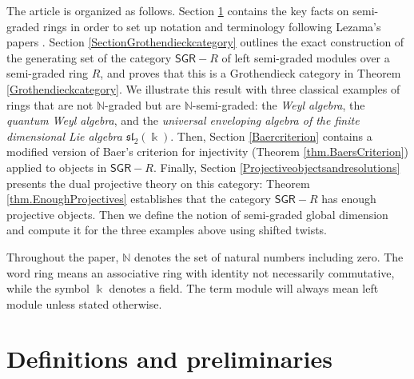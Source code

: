\documentclass[reqno]{amsart}
\theoremstyle{definition}
\theoremstyle{remark}
\numberwithin{equation}{section}
\begin{document}
The article is organized as follows. Section \ref{DefinitionsandPreliminaries} contains the key facts on semi-graded rings in order to set up notation and terminology following Lezama's papers \cite{Lezama2021, LezamaLatorre2017}. Section \ref{SectionGrothendieckcategory} outlines the exact construction of the generating set of the category $\mathsf{SGR}-R$ of left semi-graded modules over a semi-graded ring $R$, and proves that this is a Grothendieck category in Theorem \ref{Grothendieckcategory}. We illustrate this result with three classical examples of rings that are not $\mathbb{N}$-graded but are $\mathbb{N}$-semi-graded: the {\em Weyl algebra}, the {\em quantum Weyl algebra}, and the {\em universal enveloping algebra of the finite dimensional Lie algebra} $\mathfrak{sl}_2(\Bbbk)$. Then, Section \ref{Baercriterion} contains a modified version of Baer's criterion for injectivity (Theorem \ref{thm.BaersCriterion}) applied to objects in $\mathsf{SGR}-R$. Finally, Section \ref{Projectiveobjectsandresolutions} presents the dual projective theory on this category: Theorem \ref{thm.EnoughProjectives} establishes that the category $\mathsf{SGR}-R$ has enough projective objects. Then we define the notion of semi-graded global dimension and compute it for the three examples above using shifted twists. %

Throughout the paper, $\mathbb{N}$ denotes the set of natural numbers including zero. The word ring means an associative ring with identity not necessarily commutative, while the symbol $\Bbbk$ denotes a field. The term module will always mean left module unless stated otherwise.


\section{Definitions and preliminaries}\label{DefinitionsandPreliminaries}
\end{document}
